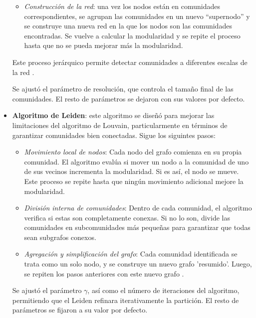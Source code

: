 \begin{itemize}
\begin{itemize}
        \item \textit{Construcción de la red}: una vez los nodos están en comunidades correspondientes, se agrupan las comunidades en un nuevo “supernodo” y se construye una nueva red en la que los nodos son las comunidades encontradas. Se vuelve a calcular la modularidad y se repite el proceso hasta que no se pueda mejorar más la modularidad.
    \end{itemize}

    Este proceso jerárquico permite detectar comunidades a diferentes escalas de la red \cite{Blondel2008}.

    Se ajustó el parámetro de resolución, que controla el tamaño final de las comunidades. El resto de parámetros se dejaron con sus valores por defecto.
    
    \item \textbf{Algoritmo de Leiden}: este algoritmo se diseñó para mejorar las limitaciones del algoritmo de Louvain, particularmente en términos de garantizar comunidades bien conectadas. Sigue los siguintes pasos:

    \begin{itemize}
        \item \textit{Movimiento local de nodos}: Cada nodo del grafo comienza en su propia comunidad. El algoritmo evalúa si mover un nodo a la comunidad de uno de sus vecinos incrementa la modularidad. Si es así, el nodo se mueve. Este proceso se repite hasta que ningún movimiento adicional mejore la modularidad.

        \item \textit{División interna de comunidades}: Dentro de cada comunidad, el algoritmo verifica si estas son completamente conexas. Si no lo son, divide las comunidades en subcomunidades más pequeñas para garantizar que todas sean subgrafos conexos.

        \item \textit{Agregación y simplificación del grafo}: Cada comunidad identificada se trata como un solo nodo, y se construye un nuevo grafo 'resumido'. Luego, se repiten los pasos anteriores con este nuevo grafo \cite{traag2019leiden}.
    \end{itemize}
    
    Se ajustó el parámetro \(\gamma\), así como el número de iteraciones del algoritmo, permitiendo que el Leiden refinara iterativamente la partición. El resto de parámetros se fijaron a su valor por defecto. 

\end{itemize}
